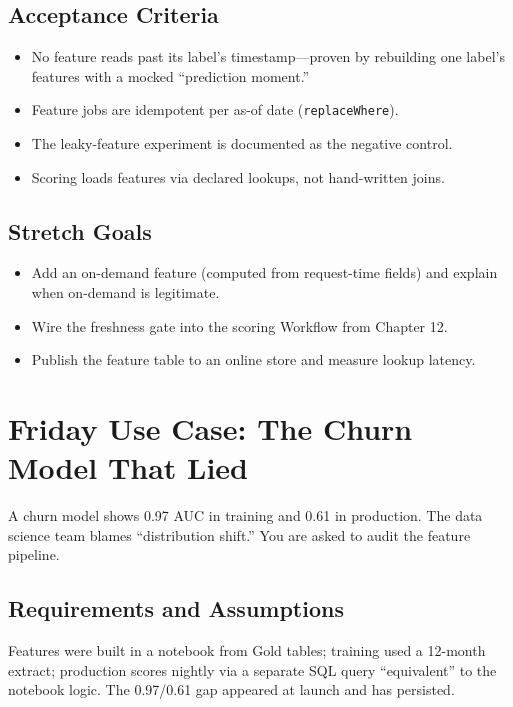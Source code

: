 \subsection*{Acceptance Criteria}
\begin{itemize}
    \item No feature reads past its label's timestamp---proven by rebuilding one label's features with a mocked ``prediction moment.''
    \item Feature jobs are idempotent per as-of date (\texttt{replaceWhere}).
    \item The leaky-feature experiment is documented as the negative control.
    \item Scoring loads features via declared lookups, not hand-written joins.
\end{itemize}

\subsection*{Stretch Goals}
\begin{itemize}
    \item Add an on-demand feature (computed from request-time fields) and explain when on-demand is legitimate.
    \item Wire the freshness gate into the scoring Workflow from Chapter 12.
    \item Publish the feature table to an online store and measure lookup latency.
\end{itemize}

\section{Friday Use Case: The Churn Model That Lied}
A churn model shows 0.97 AUC in training and 0.61 in production. The data science team blames ``distribution shift.'' You are asked to audit the feature pipeline.

\subsection{Requirements and Assumptions}
Features were built in a notebook from Gold tables; training used a 12-month extract; production scores nightly via a separate SQL query ``equivalent'' to the notebook logic. The 0.97/0.61 gap appeared at launch and has persisted.

